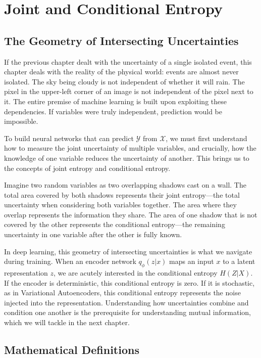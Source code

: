 \chapter{Joint and Conditional Entropy}
\label{ch:joint_conditional}

\section{The Geometry of Intersecting Uncertainties}

If the previous chapter dealt with the uncertainty of a single isolated event, this chapter deals with the reality of the physical world: events are almost never isolated. The sky being cloudy is not independent of whether it will rain. The pixel in the upper-left corner of an image is not independent of the pixel next to it. The entire premise of machine learning is built upon exploiting these dependencies. If variables were truly independent, prediction would be impossible.

To build neural networks that can predict $\mathcal{Y}$ from $\mathcal{X}$, we must first understand how to measure the joint uncertainty of multiple variables, and crucially, how the knowledge of one variable reduces the uncertainty of another. This brings us to the concepts of joint entropy and conditional entropy. 

Imagine two random variables as two overlapping shadows cast on a wall. The total area covered by both shadows represents their joint entropy---the total uncertainty when considering both variables together. The area where they overlap represents the information they share. The area of one shadow that is not covered by the other represents the conditional entropy---the remaining uncertainty in one variable after the other is fully known. 

In deep learning, this geometry of intersecting uncertainties is what we navigate during training. When an encoder network $q_\phi(z|x)$ maps an input $x$ to a latent representation $z$, we are acutely interested in the conditional entropy $H(Z|X)$. If the encoder is deterministic, this conditional entropy is zero. If it is stochastic, as in Variational Autoencoders, this conditional entropy represents the noise injected into the representation. Understanding how uncertainties combine and condition one another is the prerequisite for understanding mutual information, which we will tackle in the next chapter.

\section{Mathematical Definitions}


